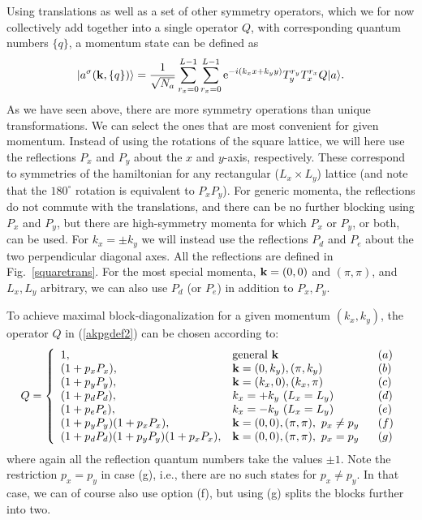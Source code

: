 \documentclass[draft,numberedheadings]{aipproc}
\begin{document}
Using translations as well as a set of other symmetry operators, which we for now collectively add together into a single operator $Q$, with 
corresponding quantum numbers $\{q\}$, a momentum state can be defined as
\begin{equation}
|a^{{\bf \sigma}} ({\bf k},\{q\})\rangle = \frac{1}{\sqrt{N_a}}\sum_{r_x=0}^{L-1}\sum_{r_x=0}^{L-1}
{\rm e}^{-i(k_xx+k_yy)}T_y^{r_y}T_x^{r_x}Q|a\rangle .
\label{akpgdef2}
\end{equation}
As we have seen above, there are more symmetry operations than unique transformations. We can select the ones that are most convenient for given 
momentum. Instead of using the rotations of the square lattice, we will here use the reflections $P_x$ and $P_y$ about the $x$ and $y$-axis, respectively. 
These correspond to symmetries of the hamiltonian for any rectangular ($L_x\times L_y$) lattice (and note that the $180^\circ$ rotation is equivalent to 
$P_xP_y$). For generic momenta, the reflections do not commute with the translations, and there can be no further blocking using $P_x$ and $P_y$, but
there are high-symmetry momenta for which $P_x$ or $P_y$, or both, can be used. For $k_x = \pm k_y$ we will instead use the reflections $P_d$ and 
$P_e$ about the two perpendicular diagonal axes. All the reflections are defined in Fig.~\ref{squaretrans}. For the most special momenta, ${\bf k}=(0,0)$ 
and $(\pi,\pi)$, and $L_x,L_y$ arbitrary, we can also use $P_d$ (or $P_e$) in addition to $P_x,P_y$.  

To achieve maximal block-diagonalization for a 
given momentum $(k_x,k_y)$, the operator $Q$ in (\ref{akpgdef2}) can be chosen according to:
\begin{equation}
Q = \left\{
\begin{array}{lll}
1,  & {\rm general~} {\bf k}  &~~(a) \\
(1+p_xP_x),  & {\bf k}=(0,k_y),(\pi,k_y) &~~(b) \\
(1+p_yP_y),  & {\bf k}=(k_x,0),(k_x,\pi) &~~(c) \\
(1+p_dP_d),  & k_x= +k_y~ (L_x=L_y) &~~(d) \\
(1+p_eP_e), &  k_x= -k_y~ (L_x=L_y) &~~(e) \\
(1+p_yP_y)(1+p_xP_x), & {\bf k}=(0,0),(\pi,\pi),~p_x\not=p_y  &~~(f)\\
(1+p_dP_d)(1+p_yP_y)(1+p_xP_x), & {\bf k}=(0,0),(\pi,\pi),~p_x=p_y &~~(g)
\end{array}\right.
\label{qdef}
\end{equation}
where again all the reflection quantum numbers take the values $\pm 1$. Note the restriction $p_x=p_y$ in case (g), i.e., there are no such states 
for $p_x \not=p_y$. In that case, we can of course also use option (f), but using (g) splits the blocks further into two.
\end{document}
